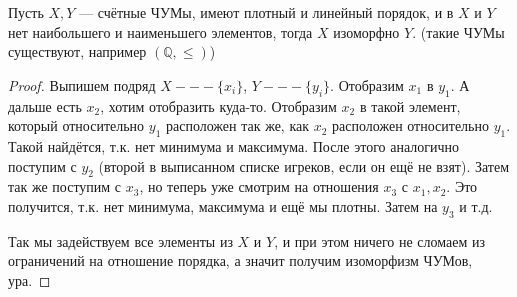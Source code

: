 \begin{theorem}
	Пусть $X, Y$ --- счётные ЧУМы, имеют плотный и линейный  порядок, и в $X$ и $Y$ нет наибольшего и наименьшего элементов, тогда $X$ изоморфно $Y$. (такие ЧУМы существуют, например $(\mathbb{Q}, \le)$)
\end{theorem}
\begin{proof}
	Выпишем подряд $X --- \{x_i\}$, $Y --- \{y_i\}$. Отобразим $x_1$ в $y_1$. А дальше есть $x_2$, хотим отобразить куда-то. Отобразим $x_2$ в такой элемент, который относительно $y_1$ расположен так же, как $x_2$ расположен относительно $y_1$.
	Такой найдётся, т.к. нет минимума и максимума. После этого аналогично поступим с $y_2$ (второй в выписанном списке игреков, если он ещё не взят). Затем так же поступим с $x_3$, но теперь уже смотрим на отношения $x_3$ с $x_1, x_2$. Это получится, т.к. нет минимума, максимума и ещё мы плотны. Затем на $y_3$ и т.д.

	Так мы задействуем все элементы из $X$ и $Y$, и при этом ничего не сломаем из ограничений на отношение порядка, а значит получим изоморфизм ЧУМов, ура. 
\end{proof}
